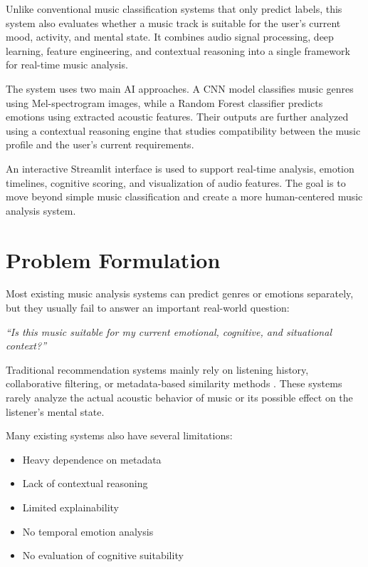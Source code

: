 \documentclass[12pt,a4paper]{report}
\begin{document}
Unlike conventional music classification systems that only predict labels, this system also evaluates whether a music track is suitable for the user’s current mood, activity, and mental state. It combines audio signal processing, deep learning, feature engineering, and contextual reasoning into a single framework for real-time music analysis.

The system uses two main AI approaches. A CNN model classifies music genres using Mel-spectrogram images, while a Random Forest classifier predicts emotions using extracted acoustic features. Their outputs are further analyzed using a contextual reasoning engine that studies compatibility between the music profile and the user’s current requirements.

An interactive Streamlit interface is used to support real-time analysis, emotion timelines, cognitive scoring, and visualization of audio features. The goal is to move beyond simple music classification and create a more human-centered music analysis system.

\section{Problem Formulation}

Most existing music analysis systems can predict genres or emotions separately, but they usually fail to answer an important real-world question:

\begin{center}
\textit{“Is this music suitable for my current emotional, cognitive, and situational context?”}
\end{center}

Traditional recommendation systems mainly rely on listening history, collaborative filtering, or metadata-based similarity methods \cite{r11}. These systems rarely analyze the actual acoustic behavior of music or its possible effect on the listener’s mental state.

Many existing systems also have several limitations:

\begin{itemize}
    \item Heavy dependence on metadata
    \item Lack of contextual reasoning
    \item Limited explainability
    \item No temporal emotion analysis
    \item No evaluation of cognitive suitability
\end{itemize}
\end{document}
